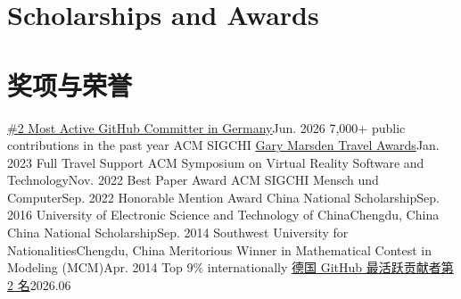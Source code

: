  {
\section{\textbf{Scholarships and Awards}}
}{
\section{\textbf{奖项与荣誉}}
}
\resumeSubHeadingListStartNoLabel
{} {
    \resumeSubheading
        {\href{https://committers.top/germany}{\#2 Most Active GitHub Committer in Germany}}{Jun. 2026}
        {7,000+ public contributions in the past year}{}
    \resumeSubheading
        {ACM SIGCHI \href{https://sigchi.org/awards/gary-marsden-travel-awards/}{Gary Marsden Travel Awards}}{Jan. 2023}
        {Full Travel Support}{}
    \resumeSubheading
        {ACM Symposium on Virtual Reality Software and Technology}{Nov. 2022}
        {Best Paper Award}{}
    \resumeSubheading
        {ACM SIGCHI Mensch und Computer}{Sep. 2022}
        {Honorable Mention Award}{}
    \resumeSubheading
        {China National Scholarship}{Sep. 2016}
        {University of Electronic Science and Technology of China}{Chengdu, China}
    \resumeSubheading
        {China National Scholarship}{Sep. 2014}
        {Southwest University for Nationalities}{Chengdu, China}
    \resumeSubheading
        {Meritorious Winner in Mathematical Contest in Modeling (MCM)}{Apr. 2014}
        {Top 9\% internationally}{}
}{
    \resumeSubheading
        {\href{https://committers.top/germany}{德国 GitHub 最活跃贡献者第 2 名}}{2026.06}
}
